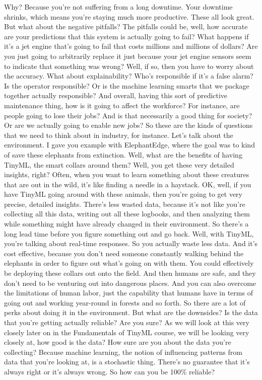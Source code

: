 Why?
Because you're not suffering from a long downtime.
Your downtime shrinks, which means you're staying much more productive.
These all look great.
But what about the negative pitfalls?
The pitfalls could be, well, how accurate are your predictions that this system is actually going to fail?
What happens if it's a jet engine that's going to fail that costs millions and millions of dollars?
Are you just going to arbitrarily replace it just because your jet engine sensors seem to indicate that something was wrong?
Well, if so, then you have to worry about the accuracy.
What about explainability?
Who's responsible if it's a false alarm?
Is the operator responsible?
Or is the machine learning smarts that we package together actually responsible?
And overall, having this sort of predictive maintenance thing, how is it going to affect the workforce?
For instance, are people going to lose their jobs?
And is that necessarily a good thing for society?
Or are we actually going to enable new jobs?
So these are the kinds of questions that we need to think about in industry, for instance.
Let's talk about the environment.
I gave you example with ElephantEdge, where the goal was to kind of save these elephants from extinction.
Well, what are the benefits of having TinyML, the smart collars around them?
Well, you get these very detailed insights, right?
Often, when you want to learn something about these creatures that are out in the wild, it's like finding a needle in a haystack.
OK, well, if you have TinyML going around with these animals, then you're going to get very precise, detailed insights.
There's less wasted data, because it's not like you're collecting all this data, writing out all these logbooks,
and then analyzing them while something might have already changed in their environment.
So there's a long lead time before you figure something out and go back.
Well, with TinyML, you're talking about real-time responses.
So you actually waste less data.
And it's cost effective, because you don't need someone constantly walking behind the elephants in order to figure out what's going on with them.
You could effectively be deploying these collars out onto the field.
And then humans are safe, and they don't need to be venturing out into dangerous places.
And you can also overcome the limitations of human labor, just the capability that humans have in terms of going out and working year-round in forests and so forth.
So there are a lot of perks about doing it in the environment.
But what are the downsides?
Is the data that you're getting actually reliable?
Are you sure?
As we will look at this very closely later on in the Fundamentals of TinyML course, we will be looking very closely at, how good is the data?
How sure are you about the data you're collecting?
Because machine learning, the notion of influencing patterns from data that you're looking at, is a stochastic thing.
There's no guarantee that it's always right or it's always wrong.
So how can you be 100\% reliable?


